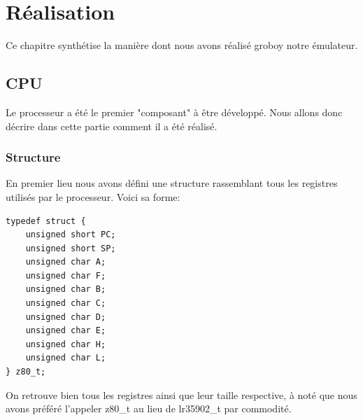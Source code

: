 \documentclass{report}
\begin{document}
\chapter{Réalisation}
Ce chapitre synthétise la manière dont nous avons réalisé groboy notre émulateur.
\section{CPU}
Le processeur a été le premier "composant" à être développé. Nous allons donc décrire dans cette partie comment il a été réalisé.
\subsection{Structure}
En premier lieu nous avons défini une structure rassemblant tous les registres utilisés par le processeur.
Voici sa forme:
\begin{lstlisting}
typedef struct {
	unsigned short PC;
	unsigned short SP;
	unsigned char A;
	unsigned char F;
	unsigned char B;
	unsigned char C;
	unsigned char D;
	unsigned char E;
	unsigned char H;
	unsigned char L;	
} z80_t;
\end{lstlisting}
On retrouve bien tous les registres ainsi que leur taille respective, à noté que nous avons préféré l'appeler z80\_t au lieu de lr35902\_t par commodité.
\end{document}
